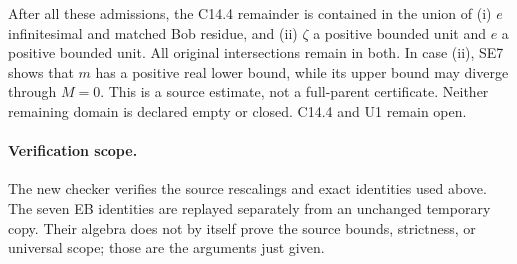 After all these admissions, the C14.4 remainder is contained in the union
of (i) $e$ infinitesimal and matched Bob residue, and (ii) $\zeta$ a
positive bounded unit and $e$ a positive bounded unit. All original
intersections remain in both. In case (ii), SE7 shows that $m$ has a
positive real lower bound, while its upper bound may diverge through
$M=0$. This is a source estimate, not a full-parent certificate. Neither
remaining domain is declared empty or closed. C14.4 and U1 remain open.

\paragraph{Verification scope.}
The new checker verifies the source rescalings and exact identities used
above. The seven EB identities are replayed separately from an unchanged
temporary copy. Their algebra does not by itself prove the source bounds,
strictness, or universal scope; those are the arguments just given.

